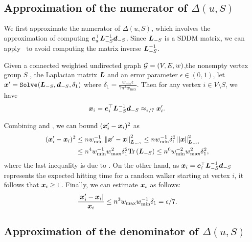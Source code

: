 \documentclass[10pt,twocolumn,twoside]{IEEEtran}
\begin{document}
\subsection{Approximation of the numerator of \(\Delta(u,S)\)}

We first approximate the numerator of \(\Delta(u,S)\), which involves the approximation of computing \(\boldsymbol{e}_u^\top\boldsymbol{L}_{-S}^{-1}\boldsymbol{d}_{-S}\).
Since \(\boldsymbol{L}_{-S}\) is a SDDM matrix, we can apply~ to avoid computing the matrix inverse \(\boldsymbol{L}_{-S}^{-1}\).
\begin{lemma}\label{lem:approx-numer}
    Given a connected weighted undirected graph \(\mathcal{G}=(V,E,w)\),the nonempty vertex group \(S\) , the Laplacian matrix \(\boldsymbol{L}\) and an error parameter \(\epsilon\in(0,1)\), let \(\boldsymbol{x}'=\mathtt{Solve}(\boldsymbol{L}_{-S},\boldsymbol{d}_{-S},\delta_1)\) where \(\delta_1=\frac{w_{\min}\epsilon}{7n^3w_{\max}}\). Then for any vertex \(i\in V\setminus S\), we have
    \begin{equation}\label{eq:approx-numer}
        \boldsymbol{x}_i=\boldsymbol{e}_i^\top\boldsymbol{L}_{-S}^{-1}\boldsymbol{d}_{-S}\approx_{\epsilon/7}\boldsymbol{x}'_i.
    \end{equation}
\end{lemma}
\begin{IEEEproof}
    Combining  and , we can bound \((\boldsymbol{x}'_i-\boldsymbol{x}_i)^2\) as
    \begin{align*}
        (\boldsymbol{x}'_i-\boldsymbol{x}_i)^2
         & \le nw_{\min}^{-1}\left\Vert\boldsymbol{x}'-\boldsymbol{x}\right\Vert^2_{\boldsymbol{L}_{-S}}
        \le nw_{\min}^{-1}\delta_1^2\left\Vert\boldsymbol{x}\right\Vert^2_{\boldsymbol{L}_{-S}}        \\
         & \le n^4w_{\min}^{-1}w_{\max}^2\delta_1^2\mathrm{Tr}\left(\boldsymbol{L}_{-S}\right)
        \le n^6w_{\min}^{-2}w_{\max}^2\delta_1^2,
    \end{align*}
    where the last inequality is due to .
    On the other hand, as \(\boldsymbol{x}_i=\boldsymbol{e}_i^\top\boldsymbol{L}_{-S}^{-1}\boldsymbol{d}_{-S}\) represents the expected hitting time for a random walker starting at vertex \(i\), it follows that \(\boldsymbol{x}_i\ge1\).
    Finally, we can estimate \(\boldsymbol{x}_i\) as follows:
    \begin{equation*}
        \frac{\left|\boldsymbol{x}'_i-\boldsymbol{x}_i \right|}{\boldsymbol{x}_i}\le n^3w_{\max}w_{\min}^{-1}\delta_1=\epsilon/7.
    \end{equation*}
\end{IEEEproof}

\subsection{Approximation of the denominator of \(\Delta(u,S)\)}
\end{document}
